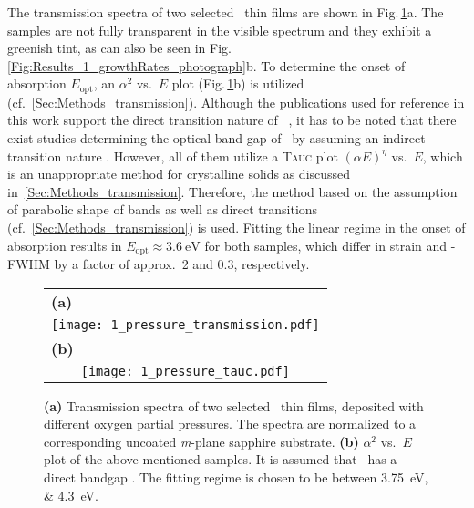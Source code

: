 The transmission spectra of two selected \cro\ thin films are shown in Fig.\,\ref{Fig:Results_1_transmission}a.
The samples are not fully transparent in the visible spectrum and they exhibit a greenish tint, as can also be seen in Fig.\,\ref{Fig:Results_1_growthRates_photograph}b.
To determine the onset of absorption $E_\mathrm{opt}$, an $\alpha^2$ vs.\ $E$ plot (Fig.\,\ref{Fig:Results_1_transmission}b) is utilized (cf.~\ref{Sec:Methods_transmission}).
Although the publications used for reference in this work support the direct transition nature of \cro\ 
    \cite{farrell2015,mi2018},
it has to be noted that there exist studies determining the optical band gap of \cro\ by assuming an indirect transition nature 
    \cite{cheng1996,al-kuhaili2007}.
However, all of them utilize a \textsc{Tauc} plot $(\alpha E)^\eta$ vs.\ $E$, which is an unappropriate method for crystalline solids as discussed in~\ref{Sec:Methods_transmission}.
Therefore, the method based on the assumption of parabolic shape of bands as well as direct transitions (cf.\ \ref{Sec:Methods_transmission}) is used.
Fitting the linear regime in the onset of absorption results in $E_\mathrm{opt}\approx\qty{3.6}{\eV}$ for both samples, which differ in strain and \textomega-FWHM by a factor of approx.\ 2 and 0.3, respectively.
\begin{figure}
    \centering
    \begin{tabular}{c}
        \multicolumn{1}{l}{\textbf{(a)}}\figSpace\\
        \texttt{[image: 1\_pressure\_transmission.pdf]}\figSpace\\
        \multicolumn{1}{l}{\textbf{(b)}}\figSpace\\
        \texttt{[image: 1\_pressure\_tauc.pdf]}
    \end{tabular}
    \caption{\textbf{(a)} Transmission spectra of two selected \cro\ thin films, deposited with different oxygen partial pressures. The spectra are normalized to a corresponding uncoated \textit{m}-plane sapphire substrate.
    \textbf{(b)} $\alpha^2$ vs.\ $E$ plot of the above-mentioned samples.
    It is assumed that \cro\ has a direct bandgap
        \cite{farrell2015,mi2018}.
    The fitting regime is chosen to be between \qtylist{3.75;4.3}{\eV}.
    }
    \label{Fig:Results_1_transmission}
\end{figure}